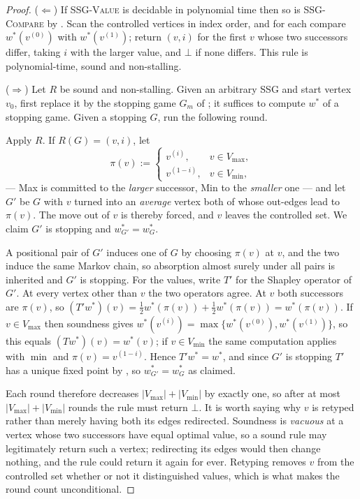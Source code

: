\documentclass[11pt]{article}
\theoremstyle{plain}
\theoremstyle{definition}
\newcommand{\Vmax}{V_{\max}}
\newcommand{\Vmin}{V_{\min}}
\begin{document}
\begin{proof}
($\Leftarrow$) If \textsc{SSG-Value} is decidable in polynomial time then
so is \textsc{SSG-Compare} by . Scan the
controlled vertices in index order, and for each compare
$w^\ast(v^{(0)})$ with $w^\ast(v^{(1)})$; return $(v,i)$ for the first
$v$ whose two successors differ, taking $i$ with the larger value, and
$\bot$ if none differs. This rule is polynomial-time, sound and
non-stalling.

($\Rightarrow$) Let $R$ be sound and non-stalling. Given an arbitrary
SSG and start vertex $v_0$, first replace it by the stopping game $G_m$
of ; it suffices to compute $w^\ast$ of a
stopping game. Given a stopping $G$, run the following round.

Apply $R$. If $R(G)=(v,i)$, let
\[
  \pi(v):=\begin{cases} v^{(i)}, & v\in\Vmax,\\[2pt] v^{(1-i)}, & v\in\Vmin,\end{cases}
\]
--- Max is committed to the \emph{larger} successor, Min to the
\emph{smaller} one --- and let $G'$ be $G$ with $v$ turned into an
\emph{average} vertex both of whose out-edges lead to $\pi(v)$. The move
out of $v$ is thereby forced, and $v$ leaves the controlled set. We claim
$G'$ is stopping and $w^\ast_{G'}=w^\ast_G$.

A positional pair of $G'$ induces one of $G$ by choosing $\pi(v)$ at $v$,
and the two induce the same Markov chain, so absorption almost surely
under all pairs is inherited and $G'$ is stopping. For the values, write
$T'$ for the Shapley operator of $G'$. At every vertex other than $v$ the
two operators agree. At $v$ both successors are $\pi(v)$, so
$(T'w^\ast)(v)=\tfrac12w^\ast(\pi(v))+\tfrac12w^\ast(\pi(v))=w^\ast(\pi(v))$.
If $v\in\Vmax$ then soundness gives
$w^\ast(v^{(i)})=\max\{w^\ast(v^{(0)}),w^\ast(v^{(1)})\}$, so this equals
$(Tw^\ast)(v)=w^\ast(v)$; if $v\in\Vmin$ the same computation applies
with $\min$ and $\pi(v)=v^{(1-i)}$. Hence $T'w^\ast=w^\ast$, and since
$G'$ is stopping $T'$ has a unique fixed point by
, so $w^\ast_{G'}=w^\ast_G$ as claimed.

Each round therefore decreases $|\Vmax|+|\Vmin|$ by exactly one, so after
at most $|\Vmax|+|\Vmin|$ rounds the rule must return $\bot$. It is worth
saying why $v$ is retyped rather than merely having both its edges
redirected. Soundness is \emph{vacuous} at a vertex whose two successors
have equal optimal value, so a sound rule may legitimately return such a
vertex; redirecting its edges would then change nothing, and the rule
could return it again for ever. Retyping removes $v$ from the controlled
set whether or not it distinguished values, which is what makes the round
count unconditional.


\end{proof}
\end{document}
